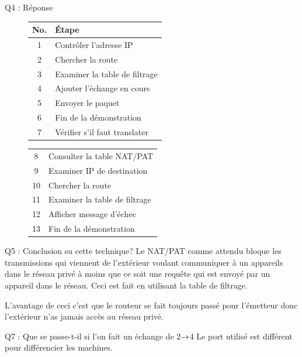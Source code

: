 \documentclass[11pt, openright]{book}
\begin{document}
\begin{dent}{Q4 : Réponse}
	
	\begin{figure}[ht!]
		\begin{tabular}{|c|l|}
			\hline
			No. & Étape                         \\
			\hline
			1   & Contrôler l'adresse IP        \\
			2   & Chercher la route             \\
			3   & Examiner la table de filtrage \\
			4   & Ajouter l'échange en cours    \\
			5   & Envoyer le paquet             \\
			6   & Fin de la démonstration       \\
			7   & Vérifier s'il faut translater \\
		\end{tabular}
		\begin{tabular}{|c|l|}
			8  & Consulter la table NAT/PAT    \\
			9  & Examiner IP de destination    \\
			10 & Chercher la route             \\
			11 & Examiner la table de filtrage \\
			12 & Afficher message d'échec      \\
			13 & Fin de la démonstration       \\
			\hline
		\end{tabular}
	\end{figure}
	
\end{dent}

\begin{dent}{Q5 :} Conclusion su cette technique?
	Le NAT/PAT comme attendu bloque les transmissions qui viennent de l'extérieur voulant communiquer à un appareils dans le réseau privé à moins que ce soit une requête qui est envoyé par un appareil dans le réseau. Ceci est fait en utilisant la table de filtrage. 
	
	L'avantage de ceci c'est que le routeur se fait toujours passé pour l'émetteur donc l'extérieur n'as jamais accès au réseau privé.
\end{dent}

\begin{dent}{Q7 :} Que se passe-t-il si l'on fait un échange de 2$\displaystyle{\to }$4
	Le port utilisé est différent pour différencier les machines. 
\end{dent}
\end{document}
